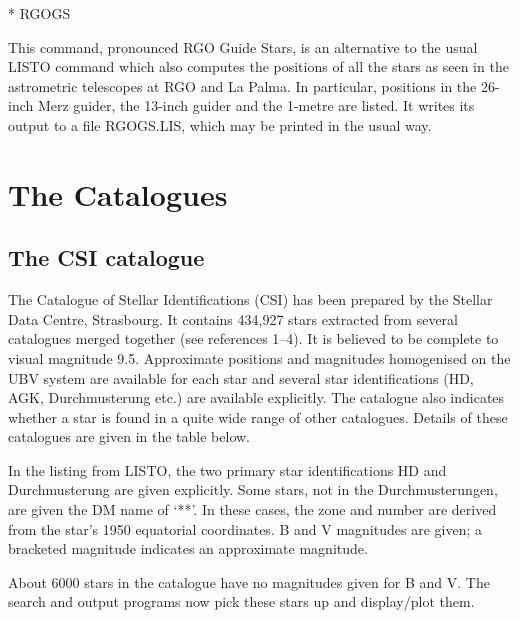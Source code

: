 * RGOGS

This command, pronounced RGO Guide Stars, is an alternative to the usual LISTO
command which also computes the positions of all the stars as seen in the
astrometric telescopes at RGO and La Palma.
In particular, positions in the 26-inch Merz guider, the 13-inch guider and the
1-metre are listed.
It writes its output to a file RGOGS.LIS, which may be printed in the usual way.
\section{The Catalogues}
\label{catalogues}
\subsection{The CSI catalogue}
The Catalogue of Stellar Identifications (CSI) has been prepared by the Stellar
Data Centre, Strasbourg.
It contains 434,927 stars extracted from several catalogues merged together (see
references 1--4).
It is believed to be complete to visual magnitude 9.5.
Approximate positions and magnitudes homogenised on the UBV system are available
for each star and several star identifications (HD, AGK, Durchmusterung etc.)
are available explicitly.
The catalogue also indicates whether a star is found in a quite wide range of
other catalogues.
Details of these catalogues are given in the table below.

In the listing from LISTO, the two primary star identifications HD and
Durchmusterung are given explicitly.
Some stars, not in the Durchmusterungen, are given the DM name of `**'.
In these cases, the zone and number are derived from the star's 1950 equatorial
coordinates.
B and V magnitudes are given; a bracketed magnitude indicates an approximate
magnitude.

About 6000 stars in the catalogue have no magnitudes given for B and V. The
search and output programs now pick these stars up and display/plot them.

